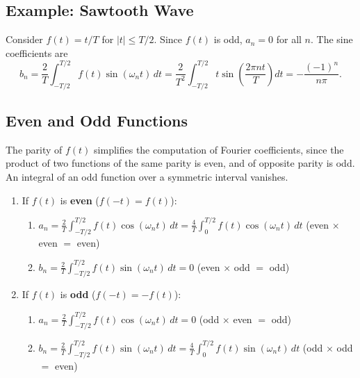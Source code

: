 \documentclass{article}
\begin{document}
\subsection{Example: Sawtooth Wave}

Consider $f(t) = t/T$ for $|t| \leq T/2$. Since $f(t)$ is odd, $a_n = 0$ for all $n$. The sine coefficients are
\[b_n = \frac{2}{T}\int_{-T/2}^{T/2} f(t)\sin(\omega_n t)\,dt = \frac{2}{T^2}\int_{-T/2}^{T/2} t\sin\!\left(\frac{2\pi n t}{T}\right)dt = -\frac{(-1)^n}{n\pi}.\]

\subsection{Even and Odd Functions}

The parity of $f(t)$ simplifies the computation of Fourier coefficients, since the product of two functions of the same parity is even, and of opposite parity is odd. An integral of an odd function over a symmetric interval vanishes.

\begin{enumerate}
    \item If $f(t)$ is \textbf{even} ($f(-t) = f(t)$):
    \begin{enumerate}[label=(\alph*)]
        \item $\displaystyle a_n = \frac{2}{T}\int_{-T/2}^{T/2} f(t)\cos(\omega_n t)\,dt = \frac{4}{T}\int_0^{T/2} f(t)\cos(\omega_n t)\,dt$ \quad (even $\times$ even $=$ even)
        \item $\displaystyle b_n = \frac{2}{T}\int_{-T/2}^{T/2} f(t)\sin(\omega_n t)\,dt = 0$ \quad (even $\times$ odd $=$ odd)
    \end{enumerate}
    \item If $f(t)$ is \textbf{odd} ($f(-t) = -f(t)$):
    \begin{enumerate}[label=(\alph*)]
        \item $\displaystyle a_n = \frac{2}{T}\int_{-T/2}^{T/2} f(t)\cos(\omega_n t)\,dt = 0$ \quad (odd $\times$ even $=$ odd)
        \item $\displaystyle b_n = \frac{2}{T}\int_{-T/2}^{T/2} f(t)\sin(\omega_n t)\,dt = \frac{4}{T}\int_0^{T/2} f(t)\sin(\omega_n t)\,dt$ \quad (odd $\times$ odd $=$ even)
    \end{enumerate}
\end{enumerate}

\end{document}
